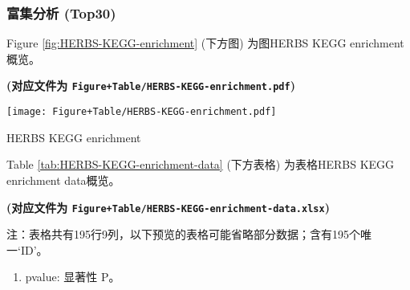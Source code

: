 \documentclass[
]{article}
\providecommand{\tightlist}{%
  \setlength{\itemsep}{0pt}\setlength{\parskip}{0pt}}
\begin{document}
\hypertarget{ux5bccux96c6ux5206ux6790-top30}{%
\subsubsection{富集分析 (Top30)}\label{ux5bccux96c6ux5206ux6790-top30}}

Figure \ref{fig:HERBS-KEGG-enrichment} (下方图) 为图HERBS KEGG enrichment概览。

\textbf{(对应文件为 \texttt{Figure+Table/HERBS-KEGG-enrichment.pdf})}

\def\@captype{figure}
\begin{center}
\texttt{[image: Figure+Table/HERBS-KEGG-enrichment.pdf]}
\caption{HERBS KEGG enrichment}\label{fig:HERBS-KEGG-enrichment}
\end{center}

Table \ref{tab:HERBS-KEGG-enrichment-data} (下方表格) 为表格HERBS KEGG enrichment data概览。

\textbf{(对应文件为 \texttt{Figure+Table/HERBS-KEGG-enrichment-data.xlsx})}

\begin{center}\begin{tcolorbox}[colback=gray!10, colframe=gray!50, width=0.9\linewidth, arc=1mm, boxrule=0.5pt]注：表格共有195行9列，以下预览的表格可能省略部分数据；含有195个唯一`ID'。
\end{tcolorbox}
\end{center}
\begin{center}\begin{tcolorbox}[colback=gray!10, colframe=gray!50, width=0.9\linewidth, arc=1mm, boxrule=0.5pt]\begin{enumerate}\tightlist
\item pvalue:  显著性 P。
\end{enumerate}\end{tcolorbox}
\end{center}
\end{document}
